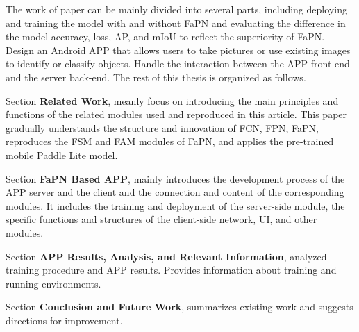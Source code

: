 The work of paper can be mainly divided into several parts, including deploying and training the model with and without FaPN and evaluating the difference in the model accuracy, loss, AP, and mIoU to reflect the superiority of FaPN. Design an Android APP that allows users to take pictures or use existing images to identify or classify objects. Handle the interaction between the APP front-end and the server back-end. The rest of this thesis is organized as follows. 

Section \uppercase\expandafter{} \textbf{Related Work}, meanly focus on introducing the main principles and functions of the related modules used and reproduced in this article. This paper gradually understands the structure and innovation of FCN, FPN, FaPN, reproduces the FSM and FAM modules of FaPN, and applies the pre-trained mobile Paddle Lite model.

Section \uppercase\expandafter{} \textbf{FaPN Based APP}, mainly introduces the development process of the APP server and the client and the connection and content of the corresponding modules. It includes the training and deployment of the server-side module, the specific functions and structures of the client-side network, UI, and other modules. 

Section \uppercase\expandafter{} \textbf{APP Results, Analysis, and Relevant Information}, analyzed training procedure and APP results. Provides information about training and running environments.


Section \uppercase\expandafter{} \textbf{Conclusion and Future Work}, summarizes existing work and suggests directions for improvement.
\clearpage